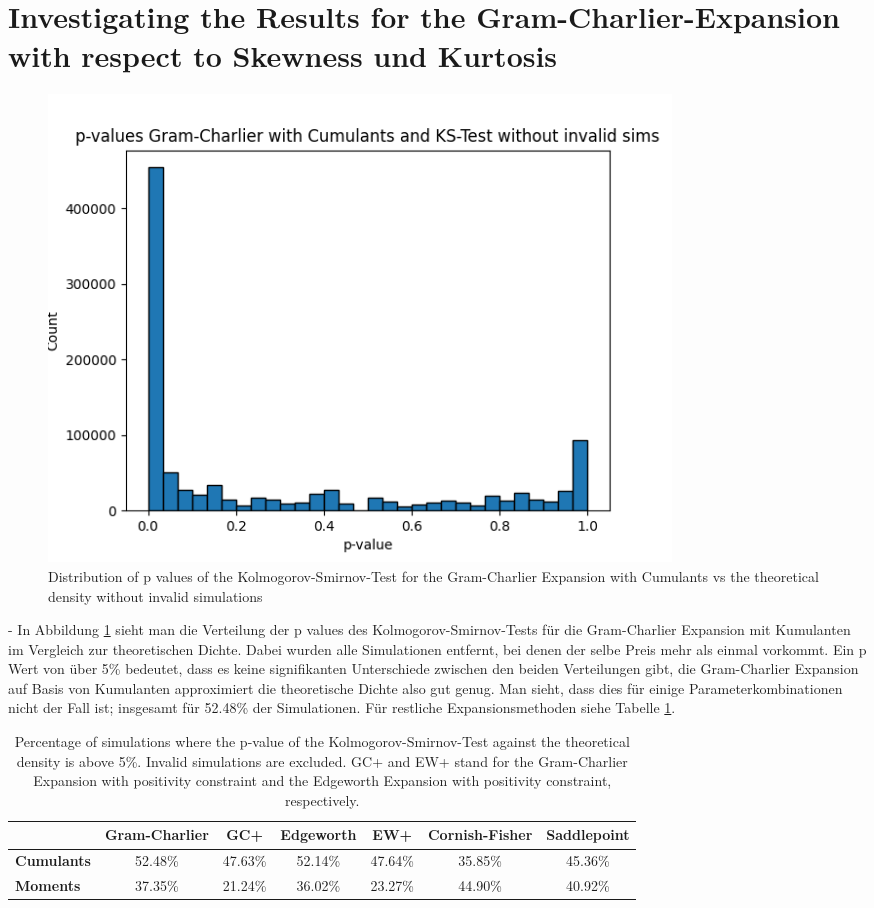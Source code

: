 \section{Investigating the Results for the Gram-Charlier-Expansion with respect to Skewness und Kurtosis}

\begin{figure}
    \centering
    \includegraphics[width=0.8\textwidth]{img/GC_cum_KS_p_value_histogram.png}
    \caption{Distribution of p values of the Kolmogorov-Smirnov-Test for the Gram-Charlier Expansion with Cumulants vs the theoretical density without invalid simulations}
    \label{fig:GC_cum_KS_p_value_histogram}
\end{figure}

- In Abbildung \ref{fig:GC_cum_KS_p_value_histogram} sieht man die Verteilung der p values des Kolmogorov-Smirnov-Tests für die Gram-Charlier Expansion mit Kumulanten im Vergleich zur theoretischen Dichte. Dabei wurden alle Simulationen entfernt, bei denen der selbe Preis mehr als einmal vorkommt. Ein p Wert von über 5\% bedeutet, dass es keine signifikanten Unterschiede zwischen den beiden Verteilungen gibt, die Gram-Charlier Expansion auf Basis von Kumulanten approximiert die theoretische Dichte also gut genug. Man sieht, dass dies für einige Parameterkombinationen nicht der Fall ist; insgesamt für 52.48\% der Simulationen. Für restliche Expansionsmethoden siehe Tabelle \ref{tab:KS_p_value_percentage}.

\begin{table}[h]
    \centering
    \begin{tabular}{l|c|c|c|c|c|c}
        & \textbf{Gram-Charlier} & \textbf{GC+} & \textbf{Edgeworth} & \textbf{EW+} & \textbf{Cornish-Fisher} & \textbf{Saddlepoint} \\
        \hline
        \textbf{Cumulants} & 52.48\% & 47.63\% & 52.14\% & 47.64\% & 35.85\% & 45.36\% \\
        \textbf{Moments} & 37.35\% & 21.24\% & 36.02\% & 23.27\% & 44.90\% & 40.92\%
    \end{tabular}
    \caption{Percentage of simulations where the p-value of the Kolmogorov-Smirnov-Test against the theoretical density is above 5\%. Invalid simulations are excluded. GC+ and EW+ stand for the Gram-Charlier Expansion with positivity constraint and the Edgeworth Expansion with positivity constraint, respectively.}
    \label{tab:KS_p_value_percentage}
\end{table}

